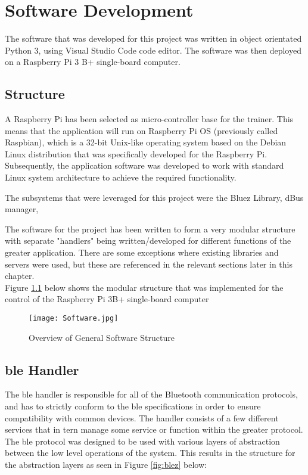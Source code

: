 
\chapter{Software Development}
\label{ch:software}
The software that was developed for this project was written in object orientated Python 3, using Visual Studio Code code editor. The software was then deployed on a Raspberry Pi 3 B+ single-board computer. 

\newpage

\section{Structure}

A Raspberry Pi has been selected as micro-controller base for the trainer. This means that the application will run on Raspberry Pi OS (previously called Raspbian), which is a 32-bit Unix-like operating system based on the Debian Linux distribution that was specifically developed for the Raspberry Pi. Subsequently, the application software was developed to work with standard Linux system architecture to achieve the required functionality.

The subsystems that were leveraged for this project were the Bluez Library, dBus manager, 

\color{red}

The software for the project has been written to form a very modular structure with separate "handlers" being written/developed for different functions of the greater application. There are some exceptions where existing libraries and servers were used, but these are referenced in the relevant sections later in this chapter.\\
Figure \ref{fig:soft} below shows the modular structure that was implemented for the control of the Raspberry Pi 3B+ single-board computer

\begin{figure}[h!]
	\begin{center}
		\texttt{[image: Software.jpg]}
		\caption{Overview of General Software Structure}
		\label{fig:soft}
	\end{center}
\end{figure}

\section{\ac{ble} Handler}
The \ac{ble} handler is responsible for all of the Bluetooth communication protocols, and has to strictly conform to the \ac{ble} specifications in order to ensure compatibility with common devices. The handler consists of a few different services that in tern manage some service or function within the greater protocol.\\
The \ac{ble} protocol was designed to be used with various layers of abstraction between the low level operations of the system. This results in the structure for the abstraction layers as seen in Figure \ref{fig:blez} below:

